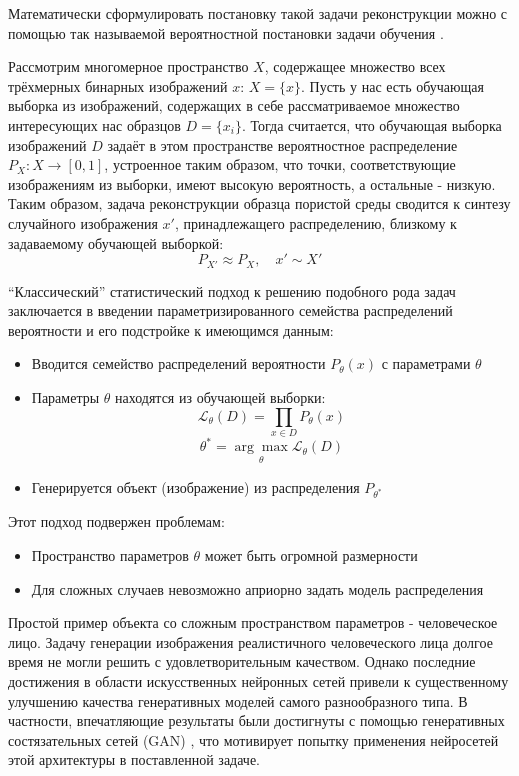 	Математически сформулировать постановку такой задачи реконструкции можно с помощью так называемой вероятностной постановки задачи обучения \cite{Vorontsov, Goodfellow}.
	
	Рассмотрим многомерное пространство $X$, содержащее множество всех трёхмерных бинарных изображений $x$: $X = \{x\}$. Пусть у нас есть обучающая выборка из изображений, содержащих в себе рассматриваемое множество интересующих нас образцов $D = \{x_i\}$. Тогда считается, что  обучающая выборка изображений $D$ задаёт в этом пространстве вероятностное распределение $P_X : X \longrightarrow [0,1]$, устроенное таким образом, что точки, соответствующие изображениям из выборки, имеют высокую вероятность, а остальные - низкую. Таким образом, задача реконструкции образца пористой среды сводится к синтезу случайного изображения $x'$, принадлежащего распределению, близкому к задаваемому обучающей выборкой:
	$$ P_{X'} \approx P_X, \quad x' \sim X'$$
	
	``Классический'' статистический подход к решению подобного рода задач заключается в введении параметризированного семейства распределений вероятности и его подстройке к имеющимся данным:
	
	\begin{itemize}
		\item Вводится семейство распределений вероятности $P_{\theta}(x)$ с параметрами $\theta$
		\item Параметры $\theta$ находятся из обучающей выборки:
		$$ \mathcal{L}_{\theta}(D) = \prod_{x \in D} P_{\theta}(x) $$
		$$ \theta^{*} = \underset{\theta}{\arg\max} \mathcal{L}_{\theta}(D)$$
		\item Генерируется объект (изображение) из распределения $ P_{\theta^{*}}$
	\end{itemize}
	
	Этот подход подвержен проблемам:
	
	\begin{itemize}
		\item Пространство параметров $\theta$ может быть огромной размерности
		\item Для сложных случаев невозможно априорно задать модель распределения
	\end{itemize}
	
	Простой пример объекта со сложным пространством параметров - человеческое лицо. Задачу генерации изображения реалистичного человеческого лица долгое время не могли решить с удовлетворительным качеством. Однако последние достижения в области искусственных нейронных сетей привели к существенному улучшению качества генеративных моделей самого разнообразного типа. В частности, впечатляющие результаты были достигнуты с помощью генеративных состязательных сетей (GAN) \cite{Mirza, Gauthier, Zhao, Berthelot}, что мотивирует попытку применения нейросетей этой архитектуры в поставленной задаче.
	
